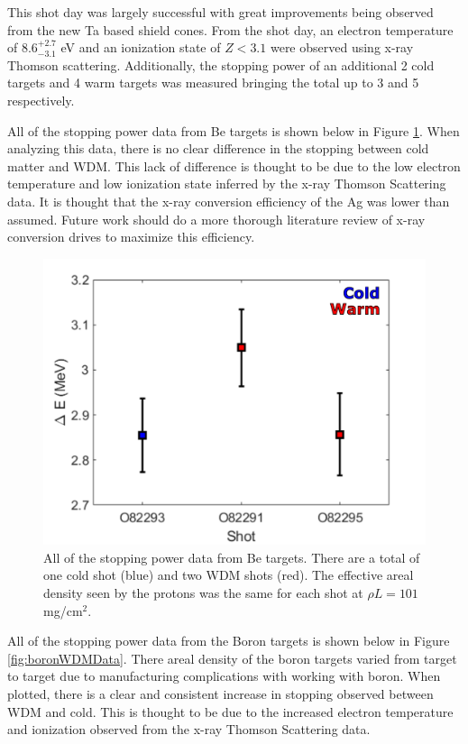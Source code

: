 This shot day was largely successful with great improvements being observed from the new Ta based shield cones. From the shot day, an electron temperature of $8.6^{+2.7}_{-3.1}$ eV and an ionization state of $Z < 3.1$ were observed using x-ray Thomson scattering. Additionally, the stopping power of an additional 2 cold targets and 4 warm targets was measured bringing the total up to 3 and 5 respectively. 

All of the stopping power data from Be targets is shown below in Figure \ref{fig:beWDMData}. When analyzing this data, there is no clear difference in the stopping between cold matter and WDM. This lack of difference is thought to be due to the low electron temperature and low ionization state inferred by the x-ray Thomson Scattering data. It is thought that the x-ray conversion efficiency of the Ag was lower than assumed. Future work should do a more thorough literature review of x-ray conversion drives to maximize this efficiency. 

\begin{figure}[!h]
    \centering
    \includegraphics[scale=0.7]{Figures/beWDMData.pdf}
    \caption[Stopping power data from Be Targets]{All of the stopping power data from Be targets. There are a total of one cold shot (blue) and two WDM shots (red). The effective areal density seen by the protons was the same for each shot at $\rho L=101$ mg/cm$^2$.}
    \label{fig:beWDMData}
\end{figure}

All of the stopping power data from the Boron targets is shown below in Figure \ref{fig:boronWDMData}. There areal density of the boron targets varied from target to target due to manufacturing complications with working with boron. When plotted, there is a clear and consistent increase in stopping observed between WDM and cold. This is thought to be due to the increased electron temperature and ionization observed from the x-ray Thomson Scattering data.

